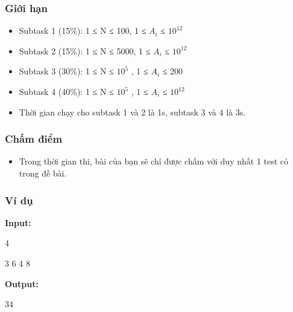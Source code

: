 \subsubsection{   Giới hạn  }
\begin{itemize}
	\item     Subtask 1 (15\%): 1 ≤ N ≤ 100, 1 ≤ $A_{i}$    ≤ $10^{12}$
	\item     Subtask 2 (15\%): 1 ≤ N ≤ 5000, 1 ≤ $A_{i}$    ≤ $10^{12}$
	\item     Subtask 3 (30\%): 1 ≤ N ≤ $10^{5}$    , 1 ≤ $A_{i}$    ≤ 200   
	\item     Subtask 4 (40\%): 1 ≤ N ≤ $10^{5}$    , 1 ≤ $A_{i}$    ≤ $10^{12}$
	\item     Thời gian chạy cho subtask 1 và 2 là 1s, subtask 3 và 4 là 3s.   
\end{itemize}

\subsubsection{   Chấm điểm  }
\begin{itemize}
	\item     Trong thời gian thi, bài của bạn sẽ chỉ được chấm với duy nhất 1 test có trong đề bài.   
\end{itemize}

\subsubsection{   Ví dụ  }

\textbf{    Input:   }

   4   


   3 6 4 8  

\textbf{    Output:   }

   34  
